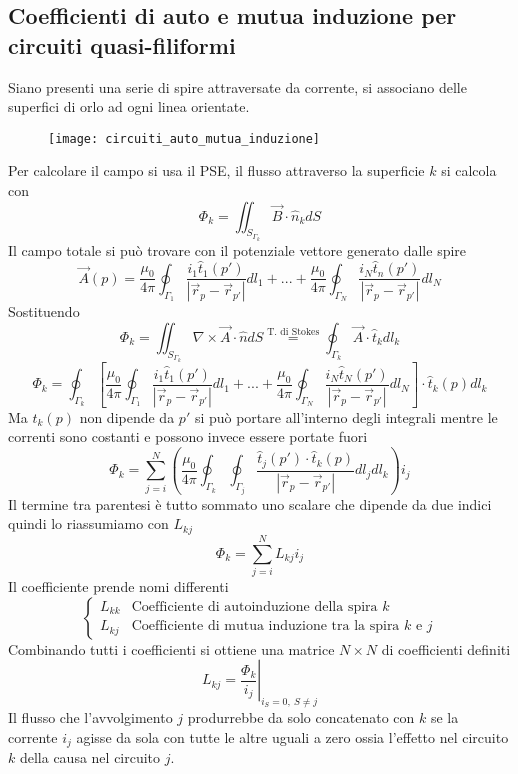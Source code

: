 \subsection{Coefficienti di auto e mutua induzione per circuiti quasi-filiformi}
Siano presenti una serie di spire attraversate da corrente, si associano delle superfici
di orlo ad ogni linea orientate.
\begin{figure}[H]
\centering
\texttt{[image: circuiti\_auto\_mutua\_induzione]}
\end{figure}
Per calcolare il campo si usa il PSE, il flusso attraverso la superficie $k$ si calcola
con 
$$
\Phi_k = \iint_{S_{\Gamma_k}}\vec{B}\cdot\hat{n}_k dS
$$
Il campo totale si può trovare con il potenziale vettore generato dalle spire
$$
\vec{A}(p) = \frac{\mu_0}{4\pi}\oint_{\Gamma_1} \frac{i_1\hat{t}_1(p')}{|\vec{r}_p - \vec{r}_{p'}|}dl_1 + ... + \frac{\mu_0}{4\pi}\oint_{\Gamma_N} \frac{i_N\hat{t}_n(p')}{|\vec{r}_p-\vec{r}_{p'}|}dl_N
$$
Sostituendo
$$
\Phi_k = \iint_{S_{\Gamma_k}} \nabla\times\vec{A}\cdot\hat{n}dS \stackrel{\text{T. di Stokes}}{=} \oint_{\Gamma_k}\vec{A}\cdot\hat{t}_kdl_k
$$
$$
\Phi_k = \oint_{\Gamma_k} \left[\frac{\mu_0}{4\pi} \oint_{\Gamma_1} \frac{i_1\hat{t}_1(p')}{|\vec{r}_p - \vec{r}_{p'}|}dl_1 + ... + \frac{\mu_0}{4\pi}\oint_{\Gamma_N} \frac{i_N\hat{t}_N(p')}{|\vec{r}_p - \vec{r}_{p'}|}dl_N \right]\cdot \hat{t}_k(p) dl_k
$$
Ma $t_k(p)$ non dipende da $p'$ si può portare all'interno degli integrali mentre
le correnti sono costanti e possono invece essere portate fuori
$$
\Phi_k = \sum_{j=i}^N \left(\frac{\mu_0}{4\pi} \oint_{\Gamma_k}\oint_{\Gamma_j} \frac{\hat{t}_j(p')\cdot\hat{t}_k(p)}{|\vec{r}_p-\vec{r}_{p'}|} dl_j dl_k \right)i_j
$$
Il termine tra parentesi è tutto sommato uno scalare che dipende da due indici quindi lo 
riassumiamo con $L_{kj}$
$$
\Phi_k = \sum_{j=i}^N L_{kj} i_j
$$
Il coefficiente prende nomi differenti
$$
\begin{cases}
L_{kk} & \text{Coefficiente di autoinduzione della spira } k\\
L_{kj} & \text{Coefficiente di mutua induzione tra la spira } k \text{ e } j
\end{cases}
$$
Combinando tutti i coefficienti si ottiene una matrice $N\times N$ di coefficienti definiti
$$
L_{kj} = \left.\frac{\Phi_k}{i_j}\right|_{i_S = 0,\ S\neq j}
$$
Il flusso che l'avvolgimento $j$ produrrebbe da solo concatenato con $k$ se la corrente
$i_j$ agisse da sola con tutte le altre uguali a zero ossia l'effetto nel circuito $k$
della causa nel circuito $j$.

